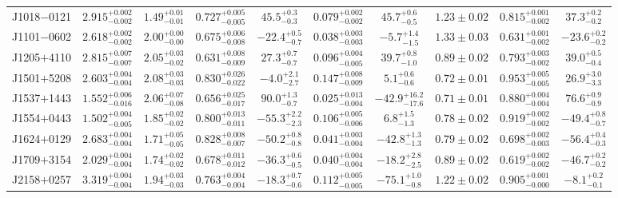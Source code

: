 \documentclass{aa}
\begin{document}
\begin{table}
\begin{tabular}{lccccccccc}
J1018$-$0121 &         $2.915_{-0.002}^{+0.002}$ &         $1.49_{-0.01}^{+0.01}$ &         $0.727_{-0.005}^{+0.005}$ &         $45.5_{-0.3}^{+0.3}$ &         $0.079_{-0.002}^{+0.002}$ &         $45.7_{-0.5}^{+0.6}$ &         $1.23 \pm 0.02$ &         $0.815_{-0.002}^{+0.001}$ &         $37.3_{-0.2}^{+0.2}$ \\ 
J1101$-$0602 &         $2.618_{-0.002}^{+0.002}$ &         $2.00_{-0.00}^{+0.00}$ &         $0.675_{-0.008}^{+0.006}$ &         $-22.4_{-0.7}^{+0.5}$ &         $0.038_{-0.003}^{+0.003}$ &         $-5.7_{-1.5}^{+1.4}$ &         $1.33 \pm 0.03$ &         $0.631_{-0.002}^{+0.001}$ &         $-23.6_{-0.2}^{+0.2}$ \\ 
J1205$+$4110 &         $2.815_{-0.007}^{+0.007}$ &         $2.05_{-0.02}^{+0.03}$ &         $0.631_{-0.009}^{+0.008}$ &         $27.3_{-0.7}^{+0.7}$ &         $0.096_{-0.005}^{+0.004}$ &         $39.7_{-1.0}^{+0.8}$ &         $0.89 \pm 0.02$ &         $0.793_{-0.002}^{+0.003}$ &         $39.0_{-0.4}^{+0.5}$ \\ 
J1501$+$5208 &         $2.603_{-0.004}^{+0.004}$ &         $2.08_{-0.03}^{+0.03}$ &         $0.830_{-0.022}^{+0.026}$ &         $-4.0_{-2.7}^{+2.1}$ &         $0.147_{-0.009}^{+0.008}$ &         $5.1_{-0.6}^{+0.6}$ &         $0.72 \pm 0.01$ &         $0.953_{-0.005}^{+0.005}$ &         $26.9_{-3.3}^{+3.0}$ \\ 
J1537$+$1443 &         $1.552_{-0.016}^{+0.006}$ &         $2.06_{-0.08}^{+0.07}$ &         $0.656_{-0.017}^{+0.025}$ &         $90.0_{-0.7}^{+1.3}$ &         $0.025_{-0.004}^{+0.013}$ &         $-42.9_{-17.6}^{+16.2}$ &         $0.71 \pm 0.01$ &         $0.880_{-0.004}^{+0.004}$ &         $76.6_{-0.9}^{+0.9}$ \\ 
J1554$+$0443 &         $1.502_{-0.005}^{+0.004}$ &         $1.85_{-0.02}^{+0.02}$ &         $0.800_{-0.011}^{+0.013}$ &         $-55.3_{-2.3}^{+2.2}$ &         $0.106_{-0.006}^{+0.005}$ &         $6.8_{-1.3}^{+1.5}$ &         $0.78 \pm 0.02$ &         $0.919_{-0.002}^{+0.002}$ &         $-49.4_{-0.7}^{+0.8}$ \\ 
J1624$+$0129 &         $2.683_{-0.004}^{+0.004}$ &         $1.71_{-0.05}^{+0.05}$ &         $0.828_{-0.007}^{+0.008}$ &         $-50.2_{-0.8}^{+0.8}$ &         $0.041_{-0.004}^{+0.003}$ &         $-42.8_{-1.3}^{+1.3}$ &         $0.79 \pm 0.02$ &         $0.698_{-0.003}^{+0.002}$ &         $-56.4_{-0.3}^{+0.4}$ \\ 
J1709$+$3154 &         $2.029_{-0.004}^{+0.004}$ &         $1.74_{-0.02}^{+0.02}$ &         $0.678_{-0.012}^{+0.011}$ &         $-36.3_{-0.5}^{+0.6}$ &         $0.040_{-0.004}^{+0.004}$ &         $-18.2_{-2.5}^{+2.8}$ &         $0.89 \pm 0.02$ &         $0.619_{-0.002}^{+0.002}$ &         $-46.7_{-0.2}^{+0.2}$ \\ 
J2158$+$0257 &         $3.319_{-0.004}^{+0.004}$ &         $1.94_{-0.03}^{+0.03}$ &         $0.763_{-0.004}^{+0.004}$ &         $-18.3_{-0.6}^{+0.7}$ &         $0.112_{-0.005}^{+0.005}$ &         $-75.1_{-0.8}^{+1.0}$ &         $1.22 \pm 0.02$ &         $0.905_{-0.000}^{+0.001}$ &         $-8.1_{-0.1}^{+0.2}$ \\ 
\hline


\end{tabular}
\end{table}
\end{document}
